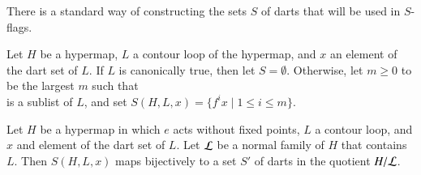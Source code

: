 

%
%


There is a standard way of constructing the sets $S$ of darts that
will be used in $S$-flags.  


\begin{definition}[S]
Let $H$ be a hypermap, $L$ a contour loop of the hypermap,
and $x$ an element of the dart set of $L$.
If  $L$ is  canonically true, then let $S=\emptyset$.
Otherwise,
let $m\ge0$ to be the largest $m$ 
such that 
\begin{displaymath}
[x;f x; f^2 x;\ldots;f^{m+1} x]
\end{displaymath}  
is a sublist of $L$, and
set $S(H,L,x) = \{f^i x \mid 1 \le i\le m\}$.
\end{definition}

\begin{lemma}\label{lemma:flag-set-quotient}
Let $H$ be a hypermap in which $e$ acts without fixed points, 
$L$ a contour loop, and $x$ and element of the dart set of $L$.
Let ${\cal L}$ be a normal family of $H$ that contains $L$.
Then $S(H,L,x)$ maps bijectively to a set $S'$ of darts in the quotient $H/{\cal L}$.
\end{lemma}

